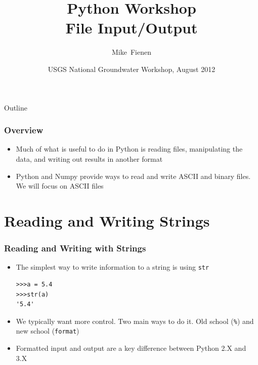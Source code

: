 \documentclass{beamer}
\title[]{Python Workshop\\
File Input/Output}
\author[Fienen] %
{Mike~Fienen}
\institute[USGS] %
{
  U.S. Geological Survey\\
  Wisconsin Water Science Center, Middleton, Wisconsin USA
  }
\date[UQ12] %
{USGS National Groundwater Workshop, August 2012}
\begin{document}
\begin{frame}
  \titlepage
\end{frame}

\begin{frame}{Outline}
\tableofcontents
\end{frame}

\begin{frame}[fragile]
\frametitle{Overview}
\begin{itemize}

\item Much of what is useful to do in Python is reading files, manipulating the data, and writing out results in another format
\item Python and Numpy provide ways to read and write ASCII and binary files. We will focus on ASCII files
\end{itemize}
\end{frame}


\section{Reading and Writing Strings}

\begin{frame}[fragile]
\frametitle{Reading and Writing with Strings}
\begin{itemize}
\item The simplest way to write information to a string is using \texttt{str}
\begin{lstlisting}
>>>a = 5.4
>>>str(a)
'5.4'
\end{lstlisting}
\item We typically want more control. Two main ways to do it. Old school (\texttt{\%}) and new school (\texttt{format})
\item Formatted input and output are a key difference between Python 2.X and 3.X

\end{itemize}
\end{frame}
\end{document}
